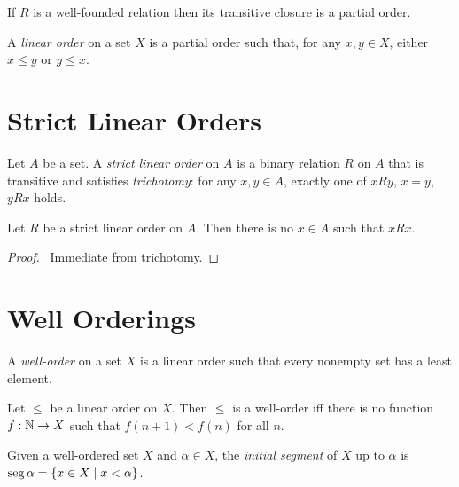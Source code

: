 \begin{theorem}
    If $R$ is a well-founded relation then its transitive
    closure is a partial order.
\end{theorem}

\begin{definition}
    A \emph{linear order} on a set $X$ is a partial order such that, for any $x, y \in X$, either $x \leq y$ or $y \leq x$.
\end{definition}

\section{Strict Linear Orders}

\begin{definition}
    Let $A$ be a set. A \emph{strict linear order} on $A$ is a binary relation
    $R$ on $A$ that is transitive and satisfies \emph{trichotomy}: for any
    $x, y \in A$, exactly one of $xRy$, $x=y$, $yRx$ holds.
\end{definition}

\begin{theorem}
    Let $R$ be a strict linear order on $A$. Then there is no $x \in A$
    such that $xRx$.
\end{theorem}

\begin{proof}
    \pf\ Immediate from trichotomy.
\end{proof}

\section{Well Orderings}

\begin{definition}
    A \emph{well-order} on a set $X$ is a linear order such that every nonempty set has a least element.
\end{definition}

\begin{proposition}
    Let $\leq$ be a linear order on $X$. Then $\leq$ is a well-order iff there is no
    function $f : \mathbb{N} \rightarrow X$ such that $f(n+1) < f(n)$ for all $n$.    
\end{proposition}

\begin{definition}
    Given a well-ordered set $X$ and $\alpha \in X$, the \emph{initial segment}
    of $X$ up to $\alpha$ is $\operatorname{seg} \alpha = \{ x \in X \mid x < \alpha \}$.
\end{definition}

